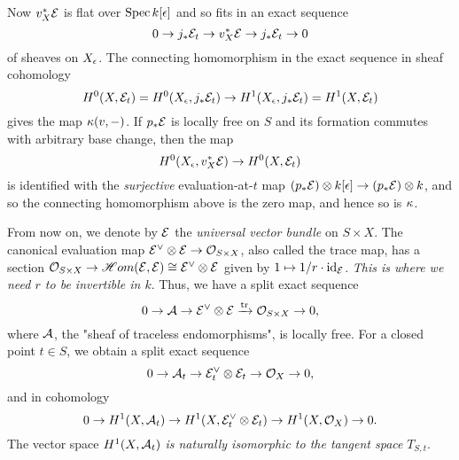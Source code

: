 \documentclass[letterpaper,12pt]{article}
\theoremstyle{remark}
\begin{document}
\begin{center}
\end{center}

Now $v_X^*\mathcal{E}$ is flat over $\operatorname{\mathrm{Spec}} k[\epsilon]$ and so fits in an exact sequence
\[ 0 \to j_* \mathcal{E}_t \to v_X^*\mathcal{E} \to j_* \mathcal{E}_t \to 0 \]
of sheaves on $X_\epsilon$. The connecting homomorphism in the exact sequence in sheaf cohomology
\[ H^0(X, \mathcal{E}_t) = H^0(X_\epsilon, j_*\mathcal{E}_t) \to H^1(X_\epsilon, j_*\mathcal{E}_t) = H^1(X, \mathcal{E}_t) \]
gives the map $\kappa(v, -)$. If $p_*\mathcal{E}$ is locally free on $S$ and its formation commutes with arbitrary base change, then the map
\[ H^0(X_\epsilon, v_X^*\mathcal{E}) \to H^0(X, \mathcal{E}_t) \]
is identified with the \emph{surjective} evaluation-at-$t$ map $(p_*\mathcal{E}) \otimes k[\epsilon] \to (p_* \mathcal{E}) \otimes k$, and so the connecting homomorphism above is the zero map, and hence so is $\kappa$. 

From now on, we denote by $\mathcal{E}$ the \emph{universal vector bundle} on $S \times X$. The canonical evaluation map $\mathcal{E}^\vee \otimes \mathcal{E} \to \mathcal{O}_{S \times X}$, also called the trace map, has a section $\mathcal{O}_{S \times X} \to \mathscr{H}om(\mathcal{E}, \mathcal{E}) \cong \mathcal{E}^\vee \otimes \mathcal{E}$ given by $1 \mapsto 1/r \cdot \mathrm{id}_{\mathcal{E}}$. \emph{This is where we need $r$ to be invertible in $k$}. Thus, we have a split exact sequence
\[ 0 \to \mathcal{A} \to \mathcal{E}^\vee \otimes \mathcal{E} \xrightarrow{\mathrm{tr}} \mathcal{O}_{S \times X} \to 0, \]
where $\mathcal{A}$, the "sheaf of traceless endomorphisms", is locally free. For a closed point $t \in S$, we obtain a split exact sequence
\[ 0 \to \mathcal{A}_t \to \mathcal{E}_t^\vee \otimes \mathcal{E}_t \to \mathcal{O}_X \to 0, \]
and in cohomology
\begin{equation} \label{H1exact}
    0 \to H^1(X, \mathcal{A}_t) \to H^1(X, \mathcal{E}_t^\vee \otimes \mathcal{E}_t) \to H^1(X, \mathcal{O}_X) \to 0.
\end{equation}
The vector space $H^1(X, \mathcal{A}_t)$ \emph{is naturally isomorphic to the tangent space} $T_{S,t}$. 
\end{document}
